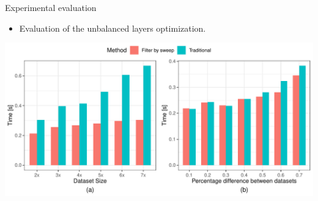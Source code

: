     \begin{frame}{Experimental evaluation}
        \begin{itemize}
            \item Evaluation of the unbalanced layers optimization.
        \end{itemize}
        \vspace{5mm}
        \centering
        \includegraphics[width=\textwidth]{../thesis/chapterSDCEL/UnbalanceTester/Unbalance_Tester}
    \end{frame}


